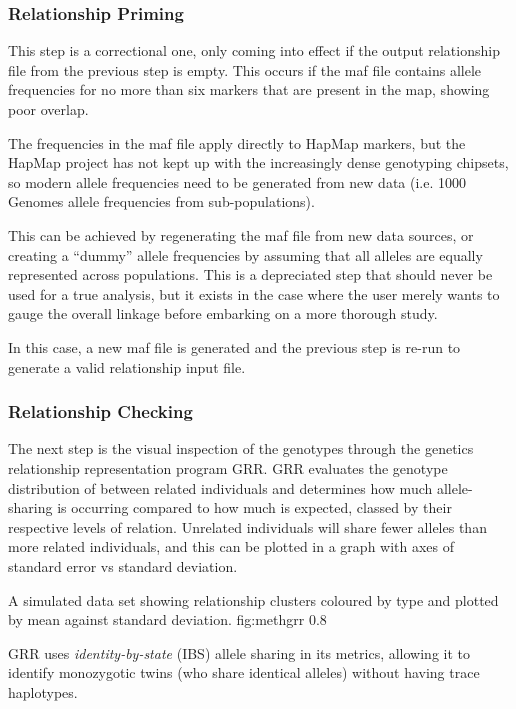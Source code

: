 \subsubsection{Relationship Priming}

This step is a correctional one, only coming into effect if the output relationship file from the previous step is empty. This occurs if the maf file contains allele frequencies for no more than six markers that are present in the map, showing poor overlap.

The frequencies in the maf file apply directly to HapMap markers, but the HapMap project has not kept up with the increasingly dense genotyping chipsets, so modern allele frequencies need to be generated from new data (i.e. 1000 Genomes allele frequencies from sub-populations).

This can be achieved by regenerating the maf file from new data sources, or creating a “dummy” allele frequencies by assuming that all alleles are equally represented across populations. This is a depreciated step that should never be used for a true analysis, but it exists in the case where the user merely wants to gauge the overall linkage before embarking on a more thorough study.

In this case, a new maf file is generated and the previous step is re-run to generate a valid relationship input file.

\subsubsection{Relationship Checking}

The next step is the visual inspection of the genotypes through the genetics relationship representation program \gls{GRR}. GRR evaluates the genotype distribution of between related individuals and determines how much allele-sharing is occurring compared to how much is expected, classed by their respective levels of relation. Unrelated individuals will share fewer alleles than more related individuals, and this can be plotted in a graph with axes of standard error vs standard deviation. 

	{A simulated data set showing relationship clusters coloured by type and plotted by mean against standard deviation.}
	{fig:methgrr}
	{0.8}
	
GRR uses \textit{identity-by-state} (\gls{IBS}) allele sharing in its metrics, allowing it to identify monozygotic twins (who share identical alleles) without having trace haplotypes. 

